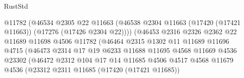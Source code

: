 \begin{lexlean}{RustStd}
\begin{coremodule}
                                      @11782
                                      (@46534
                                        @2305
                                        @22
                                        @11663
                                        (@46538
                                          @2304
                                          @11663
                                          (@17420 (@17421 @11663))
                                          (@17276 (@17426 @2304 @22))))
                                      (@46453
                                        @2316
                                        @2326
                                        @2362
                                        @22
                                        @11689
                                        @11698
                                        @4506
                                        @11782
                                        (@46464
                                          @2315
                                          @1302
                                          @11
                                          @11689
                                          @11696
                                          @4715
                                          (@46473
                                            @2314
                                            @17
                                            @19
                                            @6233
                                            @11688
                                            @11695
                                            @4568
                                            @11669
                                            @4536
                                            @23302
                                            (@46472
                                              @2312
                                              @104
                                              @17
                                              @14
                                              @11685
                                              @4506
                                              @4517
                                              @4568
                                              @11679
                                              @4536
                                              (@23312
                                                @2311
                                                @11685
                                                (@17420 (@17421 @11685))

\end{coremodule}
\end{lexlean}

